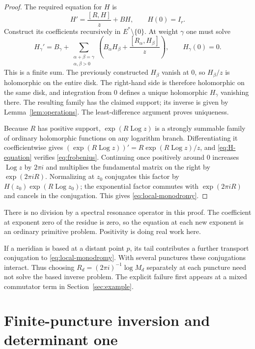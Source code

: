 \documentclass[11pt,letterpaper]{article}
\numberwithin{equation}{section}
\theoremstyle{definition}
\theoremstyle{remark}
\newcommand{\Log}{\operatorname{Log}}
\begin{document}
\begin{proof}
The required equation for $H$ is
\begin{equation}\label{eq:H-equation}
 H'=\frac{[R,H]}{z}+BH,\qquad H(0)=I_r.
\end{equation}
Construct its coefficients recursively in $E^*\setminus\{0\}$. At weight
$\gamma$ one must solve
\[
 H_\gamma'=B_\gamma+
 \sum_{\substack{\alpha+\beta=\gamma\\\alpha,\beta>0}}
 \left(B_\alpha H_\beta+\frac{[R_\alpha,H_\beta]}{z}\right),
 \qquad H_\gamma(0)=0.
\]
This is a finite sum. The previously constructed $H_\beta$ vanish at $0$,
so $H_\beta/z$ is holomorphic on the entire disk. The right-hand side is
therefore holomorphic on the same disk, and integration from $0$ defines a
unique holomorphic $H_\gamma$ vanishing there. The resulting family has the
claimed support; its inverse is given by
Lemma~\ref{lem:operations}. The least-difference argument proves uniqueness.

Because $R$ has positive support, $\exp(R\Log z)$ is a strongly summable
family of ordinary holomorphic functions on any logarithm branch.
Differentiating it coefficientwise gives
$(\exp(R\Log z))'=R\exp(R\Log z)/z$, and
\eqref{eq:H-equation} verifies \eqref{eq:frobenius}. Continuing once
positively around $0$ increases $\Log z$ by $2\pi i$ and multiplies the
fundamental matrix on the right by $\exp(2\pi iR)$. Normalizing at $z_0$
conjugates this factor by
$H(z_0)\exp(R\Log z_0)$; the exponential factor commutes with
$\exp(2\pi iR)$ and cancels in the conjugation. This gives
\eqref{eq:local-monodromy}.
\end{proof}

There is no division by a spectral resonance operator in this proof.
The coefficient at exponent zero of the residue is zero, so the equation at
each new exponent is an ordinary primitive problem. Positivity is doing
real work here.

If a meridian is based at a distant point $p$, its tail contributes a further
transport conjugation to \eqref{eq:local-monodromy}. With several punctures
these conjugations interact. Thus choosing
$R_d=(2\pi i)^{-1}\log M_d$ separately at each puncture need not solve the
based inverse problem. The explicit failure first appears at a mixed
commutator term in Section~\ref{sec:example}.

\section{Finite-puncture inversion and determinant one}\label{sec:finite}
\end{document}
